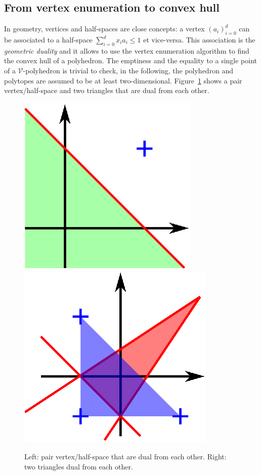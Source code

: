 \subsection{From vertex enumeration to convex hull}


In geometry, vertices and half-spaces are close concepts: a vertex $(a_i)_{i=0}^d$ can be associated to a half-space $\sum_{i=0}^d x_i a_i \leq 1$ et vice-versa. This association is the \emph{geometric duality} and it allows to use the vertex enumeration algorithm to find the convex hull of a polyhedron. The emptiness and the equality to a single point of a $\mathcal{V}$-polyhedron is trivial to check, in the following, the polyhedron and polytopes are assumed to be at least two-dimensional. Figure~\ref{ex_dual} shows a pair vertex/half-space and two triangles that are dual from each other.

\begin{figure}
\includegraphics[scale=1]{images/dual.eps}
\includegraphics[scale=1]{images/dual4.eps}
\caption{Left: pair vertex/half-space that are dual from each other. Right: two triangles dual from each other.}
\label{ex_dual}
\end{figure}

